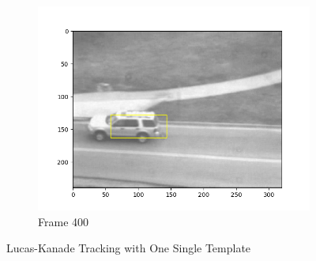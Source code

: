 \documentclass{article} %
\begin{document}
\begin{figure}[H]
\begin{subfigure}[b]{0.30\textwidth}
            \includegraphics[width=\textwidth]{q1,3_frame400.png}
            \caption{Frame 400}
        \end{subfigure}
        \caption{Lucas-Kanade Tracking with One Single Template}
    \end{figure}
\end{document}
